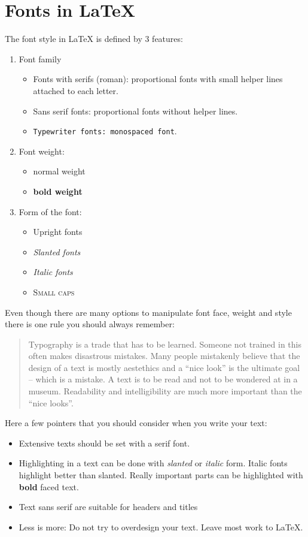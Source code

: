 \documentclass[11pt, a4paper]{article}
\newcommand{\ltx}{\LaTeX}
\begin{document}
\section{Fonts in \ltx}

The font style in \ltx{} is defined by 3 features:

\begin{enumerate}
\item Font family
\begin{itemize}
\item Fonts with serifs (roman): proportional fonts with small helper lines attached to each letter.
\item \textsf{Sans serif fonts: proportional fonts without helper lines}.
\item \texttt{Typewriter fonts: monospaced font}.
\end{itemize}
\item Font weight:
\begin{itemize}
\item normal weight
\item \textbf{bold weight}
\end{itemize}
\item Form of the font:
\begin{itemize}
\item Upright fonts
\item \textsl{Slanted fonts}
\item \textit{Italic fonts}
\item \textsc{Small caps}
\end{itemize}
\end{enumerate}

Even though there are many options to manipulate font face, weight and style there is one rule you should always remember:
\begin{quote}
Typography is a trade that has to be learned. Someone not trained in this often makes disastrous mistakes. Many people mistakenly believe that the design of a text is mostly aestethics and a ``nice look'' is the ultimate goal -- which is a mistake. A text is to be read and not to be wondered at in a museum. Readability and intelligibility are much more important than the ``nice looks''.
\end{quote}

\noindent Here a few pointers that you should consider when you write your text:
\begin{itemize}
\item[\ding{43}] Extensive texts should be set with a serif font.
\item[\ding{43}] Highlighting in a text can be done with \textsl{slanted} or \textit{italic} form. Italic fonts highlight better than slanted. Really important parts can be highlighted with \textbf{bold} faced text.
\item[\ding{43}]  \textsf{Text sans serif are suitable for headers and titles}
\item[\ding{43}] Less is more: Do not try to overdesign your text. Leave most work to \ltx.
\end{itemize}
\end{document}
